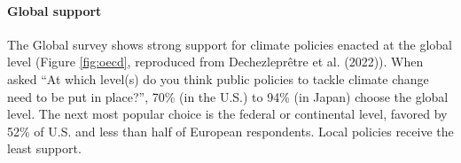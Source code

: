 \documentclass{nature}
\begin{document}

\paragraph{Global support}\label{subsubsec:global_support} %

The Global survey shows strong support for climate policies enacted at the global level (Figure \ref{fig:oecd}, reproduced from Dechezleprêtre et al. (2022)\cite{dechezlepretre_fighting_2022}). %
When asked ``At which level(s) do you think public policies to tackle climate change need to be put in place?'', 70\% (in the U.S.) to 94\% (in Japan) choose the global level. The next most popular choice is the federal or continental level, favored by 52\% of U.S. and less than half of European respondents. Local policies receive the least support. 
\end{document}
